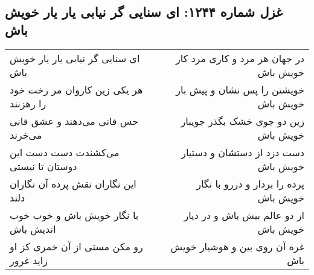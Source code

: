 \begin{center}
\section*{غزل شماره ۱۲۴۴: ای سنایی گر نیابی یار یار خویش باش}
\label{sec:1244}
\begin{longtable}{l p{0.5cm} r}
ای سنایی گر نیابی یار یار خویش باش
&&
در جهان هر مرد و کاری مرد کار خویش باش
\\
هر یکی زین کاروان مر رخت خود را رهزنند
&&
خویشتن را پس نشان و پیش بار خویش باش
\\
حس فانی می‌دهند و عشق فانی می‌خرند
&&
زین دو جوی خشک بگذر جویبار خویش باش
\\
می‌کشندت دست دست این دوستان تا نیستی
&&
دست دزد از دستشان و دستیار خویش باش
\\
این نگاران نقش پرده آن نگاران دلند
&&
پرده را بردار و دررو با نگار خویش باش
\\
با نگار خویش باش و خوب خوب اندیش باش
&&
از دو عالم بیش باش و در دیار خویش باش
\\
رو مکن مستی از آن خمری کز او زاید غرور
&&
غره آن روی بین و هوشیار خویش باش
\\
\end{longtable}
\end{center}
